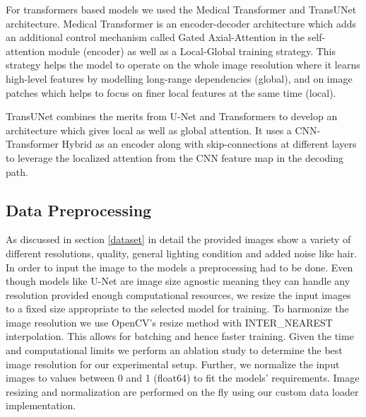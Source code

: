 \par
For transformers based models we used the Medical Transformer and TransUNet architecture. Medical Transformer is an encoder-decoder architecture which adds an additional control mechanism called Gated Axial-Attention in the self-attention module (encoder) as well as a Local-Global training strategy. This strategy helps the model to operate on the whole image resolution where it learns high-level features by modelling long-range dependencies (global), and on image patches which helps to focus on finer local features at the same time (local).

\par
TransUNet combines the merits from U-Net and Transformers to develop an architecture which gives local as well as global attention. It uses a CNN-Transformer Hybrid as an encoder along with skip-connections at different layers to leverage the localized attention from the CNN feature map in the decoding path.


\subsection{Data Preprocessing}
As discussed in section \ref{dataset} in detail the provided images show a variety of different resolutions, quality, general lighting condition and added noise like hair. In order to input the image to the models a preprocessing had to be done. Even though models like U-Net are image size agnostic meaning they can handle any resolution provided enough computational resources, we resize the input images to a fixed size appropriate to the selected model for training. To harmonize the image resolution we use OpenCV’s resize method with INTER\_NEAREST interpolation. This allows for batching and hence faster training. Given the time and computational limits we perform an ablation study to determine the best image resolution for our experimental setup. Further, we normalize the input images to values between 0 and 1 (float64) to fit the models’ requirements. Image resizing and normalization are performed on the fly using our custom data loader implementation.


